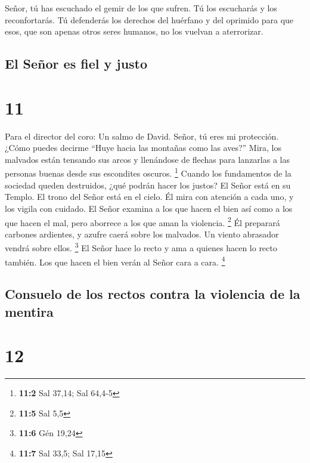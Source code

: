  Señor, tú has escuchado el gemir de los que sufren. Tú los
escucharás y los reconfortarás.  Tú defenderás los derechos
del huérfano y del oprimido para que esos, que son apenas otros seres
humanos, no los vuelvan a aterrorizar.

\hypertarget{el-seuxf1or-es-fiel-y-justo}{%
\subsection{El Señor es fiel y
justo}\label{el-seuxf1or-es-fiel-y-justo}}

\hypertarget{section-10}{%
\section{11}\label{section-10}}

Para el director del coro: Un salmo de David.  Señor, tú
eres mi protección. ¿Cómo puedes decirme ``Huye hacia las montañas como
las aves?''  Mira, los malvados están tensando sus arcos y
llenándose de flechas para lanzarlas a las personas buenas desde sus
escondites oscuros. \footnote{\textbf{11:2} Sal 37,14; Sal 64,4-5}
 Cuando los fundamentos de la sociedad queden destruidos,
¿qué podrán hacer los justos?  El Señor está en su Templo.
El trono del Señor está en el cielo. Él mira con atención a cada uno, y
los vigila con cuidado.  El Señor examina a los que hacen el
bien así como a los que hacen el mal, pero aborrece a los que aman la
violencia. \footnote{\textbf{11:5} Sal 5,5}  Él preparará
carbones ardientes, y azufre caerá sobre los malvados. Un viento
abrasador vendrá sobre ellos. \footnote{\textbf{11:6} Gén 19,24}
 El Señor hace lo recto y ama a quienes hacen lo recto
también. Los que hacen el bien verán al Señor cara a cara. \footnote{\textbf{11:7}
  Sal 33,5; Sal 17,15}

\hypertarget{consuelo-de-los-rectos-contra-la-violencia-de-la-mentira}{%
\subsection{Consuelo de los rectos contra la violencia de la
mentira}\label{consuelo-de-los-rectos-contra-la-violencia-de-la-mentira}}

\hypertarget{section-11}{%
\section{12}\label{section-11}}

